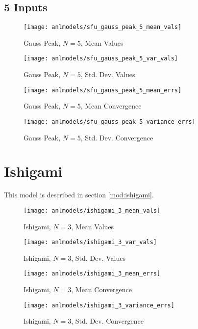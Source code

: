 \subsection{5 Inputs}
\begin{figure}[H]
  \centering
  \texttt{[image: anlmodels/sfu\_gauss\_peak\_5\_mean\_vals]}
  \caption{Gauss Peak, $N=5$, Mean Values}
  \label{fig:gauss peak mean values 5}
\end{figure}
\begin{figure}[H]
  \centering
  \texttt{[image: anlmodels/sfu\_gauss\_peak\_5\_var\_vals]}
  \caption{Gauss Peak, $N=5$, Std. Dev. Values}
  \label{fig:gauss peak var values 5}
\end{figure}

\begin{figure}[H]
  \centering
  \texttt{[image: anlmodels/sfu\_gauss\_peak\_5\_mean\_errs]}
  \caption{Gauss Peak, $N=5$, Mean Convergence}
  \label{fig:gauss peak mean errors 5}
\end{figure}
\begin{figure}[H]
  \centering
  \texttt{[image: anlmodels/sfu\_gauss\_peak\_5\_variance\_errs]}
  \caption{Gauss Peak, $N=5$, Std. Dev. Convergence}
  \label{fig:gauss peak var errors 5}
\end{figure}




\section{Ishigami}
This model is described in section \ref{mod:ishigami}.
\begin{figure}[H]
  \centering
  \texttt{[image: anlmodels/ishigami\_3\_mean\_vals]}
  \caption{Ishigami, $N=3$, Mean Values}
  \label{fig:ishigami mean values 3}
\end{figure}
\begin{figure}[H]
  \centering
  \texttt{[image: anlmodels/ishigami\_3\_var\_vals]}
  \caption{Ishigami, $N=3$, Std. Dev. Values}
  \label{fig:ishigami var values 3}
\end{figure}

\begin{figure}[H]
  \centering
  \texttt{[image: anlmodels/ishigami\_3\_mean\_errs]}
  \caption{Ishigami, $N=3$, Mean Convergence}
  \label{fig:ishigami mean errors 3}
\end{figure}
\begin{figure}[H]
  \centering
  \texttt{[image: anlmodels/ishigami\_3\_variance\_errs]}
  \caption{Ishigami, $N=3$, Std. Dev. Convergence}
  \label{fig:ishigami var errors 3}
\end{figure}


